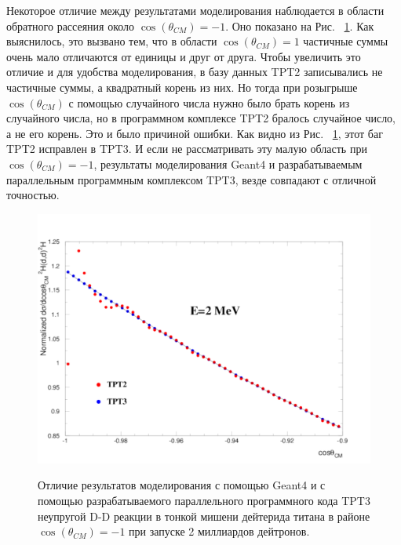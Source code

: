 \documentclass[a4paper,12pt]{article}
\begin{document}
\begin{large}
	Некоторое отличие между результатами моделирования наблюдается в области обратного рассеяния около    $\cos{ \left( \theta_{CM} \right) }=-1$.
	Оно показано на Рис. ~\ref{fig:CompareTPT2WithTPT32billionParticles}.
	Как выяснилось, это вызвано тем, что в области $\cos{ \left( \theta_{CM} \right) }=1$ частичные суммы очень мало отличаются от единицы и друг от друга.
	Чтобы увеличить это отличие и для удобства моделирования, в базу данных TPT2 записывались не частичные суммы, а квадратный корень из них.
	Но тогда при розыгрыше $\cos{ \left( \theta_{CM} \right) }$ с помощью случайного числа нужно было брать корень из случайного числа, но в программном комплексе TPT2 бралось случайное число, а не его корень. Это и было причиной ошибки.
	Как видно из Рис. ~\ref{fig:CompareTPT2WithTPT32billionParticles}, этот баг TPT2 исправлен в TPT3. 		И если не рассматривать эту малую область при $\cos{ \left( \theta_{CM} \right) }=-1$, результаты моделирования Geant4 и разрабатываемым параллельным программным комплексом TPT3, везде совпадают с отличной точностью.
	
\begin{figure}[ht]
  {
     \includegraphics[width=0.99\linewidth]{images/compare_tpt2_with_tpt3_2billion.pdf}
  }
  \caption{Отличие результатов моделирования с помощью Geant4 и с помощью разрабатываемого параллельного программного кода TPT3 неупругой D-D реакции в тонкой мишени дейтерида титана в районе $\cos{ \left( \theta_{CM} \right) }=-1$ при запуске 2 миллиардов дейтронов.}
  \label{fig:CompareTPT2WithTPT32billionParticles}
\end{figure}	
	

\clearpage{}

\end{large}
\end{document}

